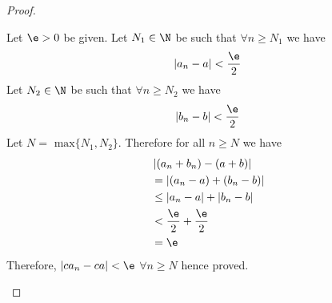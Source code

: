 \begin{proof}
\begin{enumerate}
			Let $\e > 0$ be given. Let $N_1 \in \N$ be such that $\forall n \ge N_1$ we have
			\begin{align}
				\left|a_n - a\right| < \frac{\e}{2}
			\end{align}
			Let $N_2 \in \N$ be such that $\forall n \ge N_2$ we have
			\begin{align}
				 \left|b_n - b\right| < \frac{\e}{2}
			\end{align}
			Let $N = \text{ max}\{N_1, N_2\} $. Therefore for all $n \ge N$ we have
			\begin{align}
				&\left|\left( a_n + b_n \right) - \left( a+b \right) \right| \\
				&= \left|\left( a_n - a \right) + \left( b_n - b \right) \right|\\
				&\le \left|a_n - a\right| + \left|b_n - b\right|\\
				&< \frac{\e}{2} + \frac{\e}{2}\\
				&= \e
			\end{align}
			Therefore, $\left| c a_n - c a\right| < \e$ $\forall n \ge N$ hence proved.
	\end{enumerate}
		
\end{proof}
